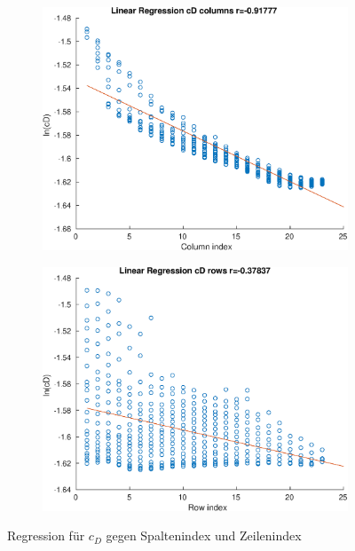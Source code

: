 \begin{figure}[h]
	\centering
	\begin{subfigure}[t]{0.5\textwidth}
		\centering
		\includegraphics[width=1\linewidth]{bilder/escooter/regressionCol}
	\end{subfigure}\hfill
	\begin{subfigure}[t]{0.5\textwidth}
		\centering
		\includegraphics[width=1\linewidth]{bilder/escooter/regressionRow}
	\end{subfigure}
	\caption{Regression für $c_D$ gegen Spaltenindex und Zeilenindex}
	\label{fig:regEscooter}
\end{figure}

